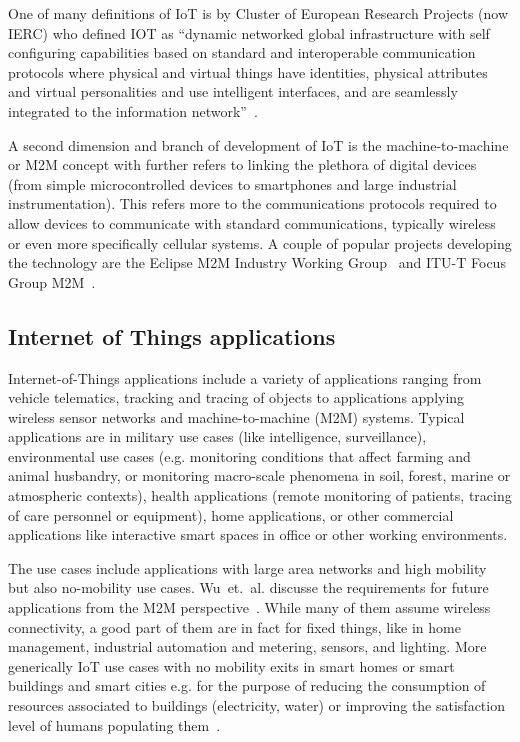 \documentclass[final]{siamltex}
\begin{document}
One of many definitions of IoT is by Cluster of European Research
Projects (now IERC) who defined IOT as ``dynamic networked global
infrastructure with self configuring capabilities based on standard
and interoperable communication protocols where physical and virtual
things have identities, physical attributes and virtual personalities
and use intelligent interfaces, and are seamlessly integrated to the
information network''~\cite{vermesan2011internet}.

A second dimension and branch of development of IoT is the machine-to-machine or
M2M concept with further refers to linking the plethora of digital devices (from
simple microcontrolled devices to smartphones and large industrial
instrumentation). This refers more to the communications protocols required to
allow devices to communicate with standard communications, typically wireless or
even more specifically cellular systems. A couple of popular projects developing
the technology are the Eclipse M2M Industry Working Group~\cite{EclipseM2M} and
ITU-T Focus Group M2M~\cite{ITU-T_FG_M2M}.

\subsection{Internet of Things applications}

Internet-of-Things applications include a variety of applications
ranging from vehicle telematics, tracking and tracing of objects to
applications applying wireless sensor networks and machine-to-machine
(M2M) systems. Typical applications are in military use cases (like
intelligence, surveillance), environmental use cases (e.g. monitoring
conditions that affect farming and animal husbandry, or monitoring
macro-scale phenomena in soil, forest, marine or atmospheric
contexts), health applications (remote monitoring of patients, tracing
of care personnel or equipment), home applications, or other
commercial applications like interactive smart spaces in office or
other working environments.

The use cases include applications with large area networks and high
mobility but also no-mobility use cases. Wu~et.~al. discusse the
requirements for future applications from the M2M
perspective~\cite{wu2011m2m}. While many of them assume wireless
connectivity, a good part of them are in fact for fixed things, like
in home management, industrial automation and metering, sensors, and
lighting. More generically IoT use cases with no mobility exits in
smart homes or smart buildings and smart cities e.g. for the purpose
of reducing the consumption of resources associated to buildings
(electricity, water) or improving the satisfaction level of humans
populating them~\cite{miorandi2012internet}.
\end{document}
